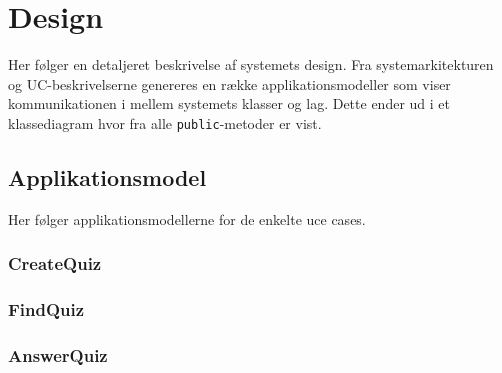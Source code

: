 \chapter{Design}
Her følger en detaljeret beskrivelse af systemets design. Fra systemarkitekturen og UC-beskrivelserne genereres en række applikationsmodeller som viser kommunikationen i mellem systemets klasser og lag. Dette ender ud i et klassediagram hvor fra alle \verb+public+-metoder er vist.

\section{Applikationsmodel}
Her følger applikationsmodellerne for de enkelte uce cases.

\subsection{CreateQuiz}

\subsection{FindQuiz}

\subsection{AnswerQuiz}

